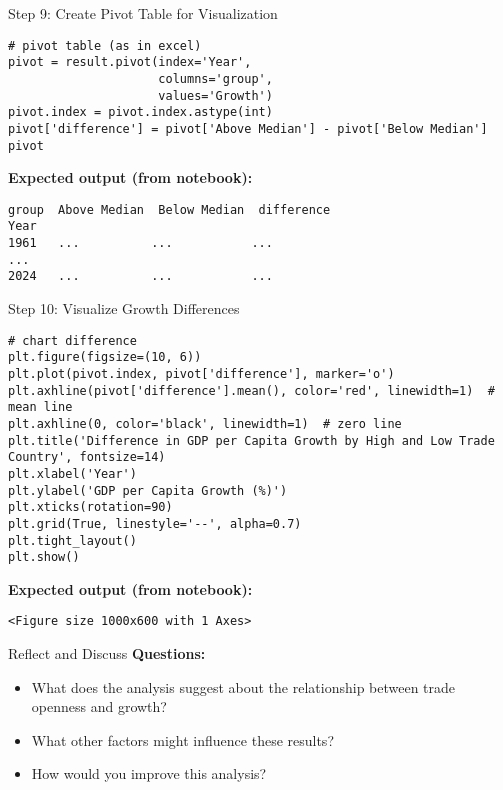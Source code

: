 \documentclass[notes,11pt, aspectratio=169, xcolor=table]{beamer}
\begin{document}
\begin{frame}[fragile]{Step 9: Create Pivot Table for Visualization}
\begin{verbatim}
# pivot table (as in excel)
pivot = result.pivot(index='Year',
                     columns='group',
                     values='Growth')
pivot.index = pivot.index.astype(int)
pivot['difference'] = pivot['Above Median'] - pivot['Below Median']
pivot
\end{verbatim}
\vspace{0.5ex}
\textbf{Expected output (from notebook):}
\begin{verbatim}
group  Above Median  Below Median  difference
Year
1961   ...          ...           ...
...
2024   ...          ...           ...
\end{verbatim}
\end{frame}

\begin{frame}[fragile]{Step 10: Visualize Growth Differences}
\begin{verbatim}
# chart difference
plt.figure(figsize=(10, 6))
plt.plot(pivot.index, pivot['difference'], marker='o')
plt.axhline(pivot['difference'].mean(), color='red', linewidth=1)  # mean line
plt.axhline(0, color='black', linewidth=1)  # zero line
plt.title('Difference in GDP per Capita Growth by High and Low Trade Country', fontsize=14)
plt.xlabel('Year')
plt.ylabel('GDP per Capita Growth (%)')
plt.xticks(rotation=90)
plt.grid(True, linestyle='--', alpha=0.7)
plt.tight_layout()
plt.show()
\end{verbatim}
\vspace{0.5ex}
\textbf{Expected output (from notebook):}
\begin{verbatim}
<Figure size 1000x600 with 1 Axes>
\end{verbatim}
\end{frame}

\begin{frame}{Reflect and Discuss}
\textbf{Questions:}
\begin{itemize}
    \item What does the analysis suggest about the relationship between trade openness and growth?
    \item What other factors might influence these results?
    \item How would you improve this analysis?
\end{itemize}
\end{frame}
\end{document}

